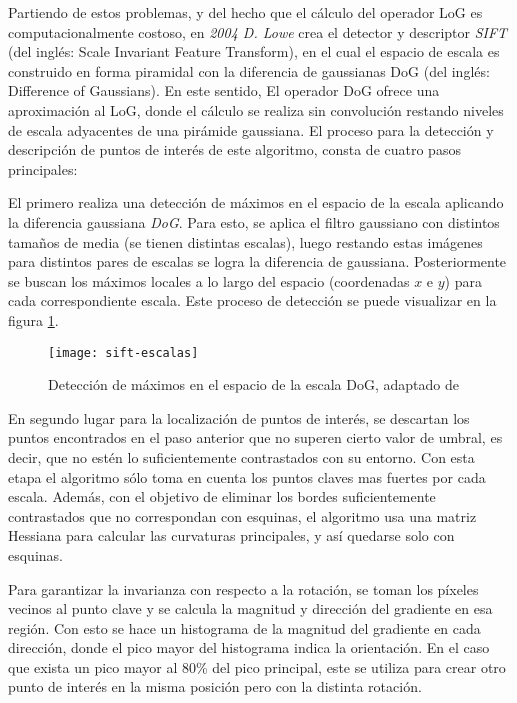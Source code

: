 Partiendo de estos problemas, y del hecho que el cálculo del operador LoG es computacionalmente costoso, en \textit{2004 D. Lowe} crea el detector y descriptor \textit{SIFT} \cite{sift} (del inglés: Scale Invariant Feature Transform), en el cual el espacio de escala es construido en forma piramidal con la diferencia de gaussianas DoG (del inglés: Difference of Gaussians). En este sentido, El operador DoG ofrece una aproximación al LoG, donde el cálculo se realiza sin convolución restando niveles de escala adyacentes de una pirámide gaussiana. El proceso para la detección y descripción de puntos de interés de este algoritmo, consta de cuatro pasos principales:

El primero realiza una detección de máximos en el espacio de la escala aplicando la diferencia gaussiana \textit{DoG}. Para esto, se aplica el filtro gaussiano con distintos tamaños de media (se tienen distintas escalas), luego restando estas imágenes para distintos pares de escalas se logra la diferencia de gaussiana. Posteriormente se buscan los máximos locales a lo largo del espacio (coordenadas $x$ e $y$) para cada correspondiente escala. Este proceso de detección se puede visualizar en la figura \ref{imagen:sift-escalas}.

\begin{figure}[H]
	\centering
	\texttt{[image: sift-escalas]}
	\caption[Detector SIFT]{Detección de máximos en el espacio de la escala DoG, adaptado de \cite{sift}}
	\label{imagen:sift-escalas}
\end{figure}

En segundo lugar para la localización de puntos de interés, se descartan los puntos encontrados en el paso anterior que no superen cierto valor de umbral, es decir, que no estén lo suficientemente contrastados con su entorno. Con esta etapa el algoritmo sólo toma en cuenta los puntos claves mas fuertes por cada escala. Además, con el objetivo de eliminar los bordes suficientemente contrastados que no correspondan con esquinas, el algoritmo usa una matriz Hessiana para calcular las curvaturas principales, y así quedarse solo con esquinas.

Para garantizar la invarianza con respecto a la rotación, se toman los píxeles vecinos al punto clave y se calcula la magnitud y dirección del gradiente en esa región. Con esto se hace un histograma de la magnitud del gradiente en cada dirección, donde el pico mayor del histograma indica la orientación. En el caso que exista un pico mayor al 80\% del pico principal, este se utiliza para crear otro punto de interés en la misma posición pero con la distinta rotación.

